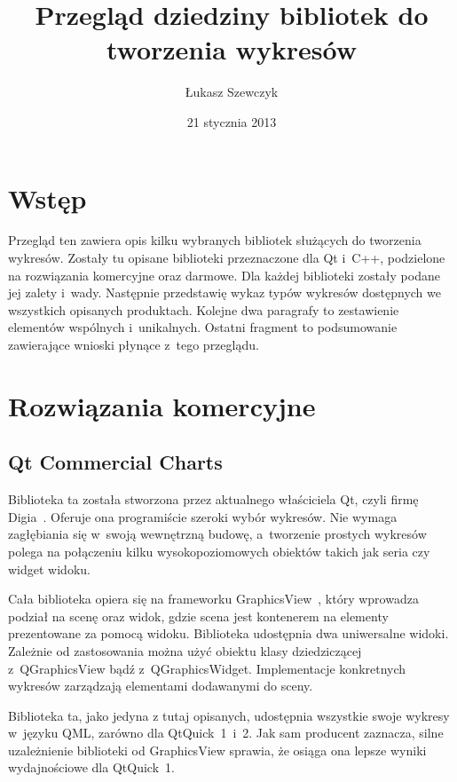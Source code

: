 \documentclass[11pt,twoside,a4paper,final]{llncs}
\begin{document}
\date{21 stycznia 2013}
\title{Przegląd dziedziny bibliotek do tworzenia wykresów}

\author{Łukasz Szewczyk}
\maketitle


\section{Wstęp}
Przegląd ten zawiera opis kilku wybranych bibliotek służących do tworzenia wykresów. Zostały tu opisane biblioteki przeznaczone dla Qt i~C++, podzielone na rozwiązania komercyjne oraz darmowe. Dla każdej biblioteki zostały podane jej zalety i~wady. Następnie przedstawię wykaz typów wykresów dostępnych we wszystkich opisanych produktach. Kolejne dwa paragrafy to zestawienie elementów wspólnych i~unikalnych. Ostatni fragment to podsumowanie zawierające wnioski płynące z~tego przeglądu.

\section{Rozwiązania komercyjne}
\subsection{Qt Commercial Charts}
Biblioteka ta została stworzona przez aktualnego właściciela Qt, czyli firmę Digia~\cite{digia}. Oferuje ona programiście szeroki wybór wykresów. Nie wymaga zagłębiania się w~swoją wewnętrzną budowę, a~tworzenie prostych wykresów polega na połączeniu kilku wysokopoziomowych obiektów takich jak seria czy widget widoku.\newline

Cała biblioteka opiera się na frameworku GraphicsView~\cite{graphicsview}, który wprowadza podział na scenę oraz widok, gdzie scena jest kontenerem na elementy prezentowane za pomocą widoku.
Biblioteka udostępnia dwa uniwersalne widoki. Zależnie od zastosowania można użyć obiektu klasy dziedziczącej z~QGraphicsView bądź z~QGraphicsWidget. Implementacje konkretnych wykresów zarządzają elementami dodawanymi do sceny.\newline

Biblioteka ta, jako jedyna z tutaj opisanych, udostępnia wszystkie swoje wykresy w~języku QML, zarówno dla QtQuick~1~i~2.
Jak sam producent zaznacza, silne uzależnienie biblioteki od GraphicsView sprawia, że osiąga ona lepsze wyniki wydajnościowe dla QtQuick~1.\newline
\end{document}
